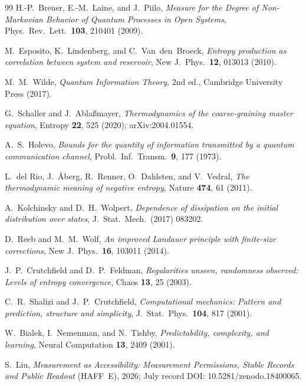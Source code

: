 \documentclass[12pt]{article}
\begin{document}
\begin{thebibliography}{99}
H.-P.~Breuer, E.-M.~Laine, and J.~Piilo,
\emph{Measure for the Degree of Non-Markovian Behavior of Quantum Processes in Open Systems},
Phys.\ Rev.\ Lett.\ \textbf{103}, 210401 (2009).

M.~Esposito, K.~Lindenberg, and C.~Van~den~Broeck,
\emph{Entropy production as correlation between system and reservoir},
New J.\ Phys.\ \textbf{12}, 013013 (2010).

M.~M.~Wilde,
\emph{Quantum Information Theory}, 2nd ed.,
Cambridge University Press (2017).

G.~Schaller and J.~Abla{\ss}mayer,
\emph{Thermodynamics of the coarse-graining master equation},
Entropy \textbf{22}, 525 (2020); arXiv:2004.01554.

A.~S.~Holevo,
\emph{Bounds for the quantity of information transmitted by a quantum communication channel},
Probl.\ Inf.\ Transm.\ \textbf{9}, 177 (1973).

L.~del Rio, J.~{\AA}berg, R.~Renner, O.~Dahlsten, and V.~Vedral,
\emph{The thermodynamic meaning of negative entropy},
Nature \textbf{474}, 61 (2011).

A.~Kolchinsky and D.~H.~Wolpert,
\emph{Dependence of dissipation on the initial distribution over states},
J.\ Stat.\ Mech.\ (2017) 083202.

D.~Reeb and M.~M.~Wolf,
\emph{An improved Landauer principle with finite-size corrections},
New J.\ Phys.\ \textbf{16}, 103011 (2014).

J.~P.~Crutchfield and D.~P.~Feldman,
\emph{Regularities unseen, randomness observed: Levels of entropy convergence},
Chaos \textbf{13}, 25 (2003).

C.~R.~Shalizi and J.~P.~Crutchfield,
\emph{Computational mechanics: Pattern and prediction, structure and simplicity},
J.\ Stat.\ Phys.\ \textbf{104}, 817 (2001).

W.~Bialek, I.~Nemenman, and N.~Tishby,
\emph{Predictability, complexity, and learning},
Neural Computation \textbf{13}, 2409 (2001).

S.~Liu, \emph{Measurement as Accessibility: Measurement Permissions, Stable Records and Public Readout} (HAFF~E), 2026; July record DOI: 10.5281/zenodo.18400065.


\end{thebibliography}
\end{document}
